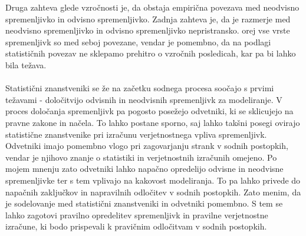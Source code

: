 \documentclass[12pt,a4paper]{amsart}
\theoremstyle{definition} %
\theoremstyle{plain} %
\begin{document}
Druga zahteva glede vzročnosti je, da obstaja empirična povezava med neodvisno spremenljivko in odvisno spremenljivko. Zadnja zahteva je, da je razmerje 
med neodvisno spremenljivko in odvisno spremenljivko nepristransko. orej vse vrste spremenljivk so med seboj povezane, vendar je pomembno, da na 
podlagi statističnih povezav ne sklepamo prehitro o vzročnih posledicah, kar pa bi lahko bila težava.\\\\
Statistični znanstveniki se že na začetku sodnega procesa soočajo s prvimi težavami - določitvijo odvisnih in neodvisnih spremenljivk za modeliranje. V 
proces določanja spremenljivk pa pogosto posežejo odvetniki, ki se sklicujejo na pravne zakone in načela. To lahko postane sporno, saj lahko takšni 
posegi ovirajo statistične znanstvenike pri izračunu verjetnostnega vpliva spremenljivk. Odvetniki imajo pomembno vlogo pri zagovarjanju strank v 
sodnih postopkih, vendar je njihovo znanje o statistiki in verjetnostnih izračunih omejeno. Po mojem mnenju zato odvetniki lahko napačno opredelijo 
odvisne in neodvisne spremenljivke ter s tem vplivajo na kakovost modeliranja. To pa lahko privede do napačnih zaključkov in napravilnih odločitev v 
sodnih postopkih. Zato menim, da je sodelovanje med statistični znanstveniki in odvetniki pomembno. S tem se lahko zagotovi pravilno opredelitev 
spremenljivk in pravilne verjetnostne izračune, ki bodo prispevali k pravičnim odločitvam v sodnih postopkih.

\end{document}
